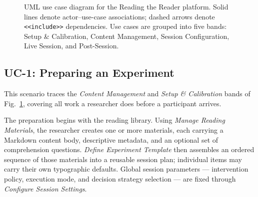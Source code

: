 \begin{figure}[p]
{%
}
\caption{%
UML use case diagram for the Reading the Reader platform.
Solid lines denote actor--use-case associations;
dashed arrows denote \texttt{<<include>>} dependencies.
Use cases are grouped into five bands:
Setup \& Calibration, Content Management, Session Configuration,
Live Session, and Post-Session.%
}
\label{fig:use-case-diagram}
\end{figure}

\subsection{UC-1: Preparing an Experiment}
\label{sec:uc1}

This scenario traces the \textit{Content Management} and \textit{Setup \&
Calibration} bands of Fig.~\ref{fig:use-case-diagram}, covering all work a
researcher does before a participant arrives.

The preparation begins with the reading library.
Using \textit{Manage Reading Materials}, the researcher creates one or more
materials, each carrying a Markdown content body, descriptive metadata, and an
optional set of comprehension questions.
\textit{Define Experiment Template} then assembles an ordered sequence of those
materials into a reusable session plan; individual items may carry their own
typographic defaults.
Global session parameters --- intervention policy, execution mode, and decision
strategy selection --- are fixed through \textit{Configure Session Settings}.

